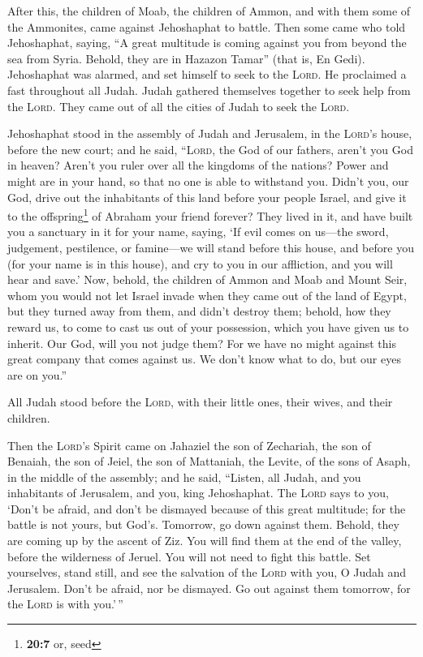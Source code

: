  After this, the children of Moab, the children of Ammon,
and with them some of the Ammonites, came against Jehoshaphat to battle.
 Then some came who told Jehoshaphat, saying, ``A great
multitude is coming against you from beyond the sea from Syria. Behold,
they are in Hazazon Tamar'' (that is, En Gedi). 
Jehoshaphat was alarmed, and set himself to seek to the \textsc{Lord}.
He proclaimed a fast throughout all Judah.  Judah gathered
themselves together to seek help from the \textsc{Lord}. They came out
of all the cities of Judah to seek the \textsc{Lord}.

 Jehoshaphat stood in the assembly of Judah and Jerusalem,
in the \textsc{Lord}'s house, before the new court;  and
he said, ``\textsc{Lord}, the God of our fathers, aren't you God in
heaven? Aren't you ruler over all the kingdoms of the nations? Power and
might are in your hand, so that no one is able to withstand you.
 Didn't you, our God, drive out the inhabitants of this
land before your people Israel, and give it to the offspring\footnote{\textbf{20:7}
  or, seed} of Abraham your friend forever?  They lived in
it, and have built you a sanctuary in it for your name, saying,
 `If evil comes on us---the sword, judgement, pestilence,
or famine---we will stand before this house, and before you (for your
name is in this house), and cry to you in our affliction, and you will
hear and save.'  Now, behold, the children of Ammon and
Moab and Mount Seir, whom you would not let Israel invade when they came
out of the land of Egypt, but they turned away from them, and didn't
destroy them;  behold, how they reward us, to come to
cast us out of your possession, which you have given us to inherit.
 Our God, will you not judge them? For we have no might
against this great company that comes against us. We don't know what to
do, but our eyes are on you.''

 All Judah stood before the \textsc{Lord}, with their
little ones, their wives, and their children.

 Then the \textsc{Lord}'s Spirit came on Jahaziel the son
of Zechariah, the son of Benaiah, the son of Jeiel, the son of
Mattaniah, the Levite, of the sons of Asaph, in the middle of the
assembly;  and he said, ``Listen, all Judah, and you
inhabitants of Jerusalem, and you, king Jehoshaphat. The \textsc{Lord}
says to you, `Don't be afraid, and don't be dismayed because of this
great multitude; for the battle is not yours, but God's. 
Tomorrow, go down against them. Behold, they are coming up by the ascent
of Ziz. You will find them at the end of the valley, before the
wilderness of Jeruel.  You will not need to fight this
battle. Set yourselves, stand still, and see the salvation of the
\textsc{Lord} with you, O Judah and Jerusalem. Don't be afraid, nor be
dismayed. Go out against them tomorrow, for the \textsc{Lord} is with
you.'\,''

